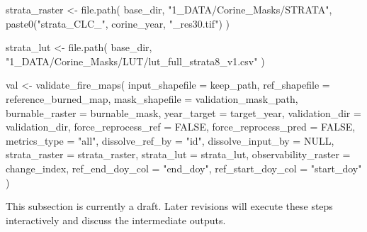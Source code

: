 \documentclass[
  british,
  a4paper,
]{scrbook}
\newenvironment{Shaded}{\begin{snugshade}}{\end{snugshade}}
\newcommand{\AttributeTok}[1]{\textcolor[rgb]{0.40,0.45,0.13}{#1}}
\newcommand{\ConstantTok}[1]{\textcolor[rgb]{0.56,0.35,0.01}{#1}}
\newcommand{\FunctionTok}[1]{\textcolor[rgb]{0.28,0.35,0.67}{#1}}
\newcommand{\NormalTok}[1]{\textcolor[rgb]{0.00,0.23,0.31}{#1}}
\newcommand{\OtherTok}[1]{\textcolor[rgb]{0.00,0.23,0.31}{#1}}
\newcommand{\StringTok}[1]{\textcolor[rgb]{0.13,0.47,0.30}{#1}}
\begin{document}
\begin{Shaded}
\begin{Highlighting}[]
\NormalTok{strata\_raster }\OtherTok{\textless{}{-}} \FunctionTok{file.path}\NormalTok{(}
\NormalTok{  base\_dir,}
  \StringTok{"1\_DATA/Corine\_Masks/STRATA"}\NormalTok{,}
  \FunctionTok{paste0}\NormalTok{(}\StringTok{"strata\_CLC\_"}\NormalTok{, corine\_year, }\StringTok{"\_res30.tif"}\NormalTok{)}
\NormalTok{)}

\NormalTok{strata\_lut }\OtherTok{\textless{}{-}} \FunctionTok{file.path}\NormalTok{(}
\NormalTok{  base\_dir,}
  \StringTok{"1\_DATA/Corine\_Masks/LUT/lut\_full\_strata8\_v1.csv"}
\NormalTok{)}
\end{Highlighting}
\end{Shaded}

\begin{Shaded}
\begin{Highlighting}[]
\NormalTok{val }\OtherTok{\textless{}{-}} \FunctionTok{validate\_fire\_maps}\NormalTok{(}
  \AttributeTok{input\_shapefile =}\NormalTok{ keep\_path,}
  \AttributeTok{ref\_shapefile =}\NormalTok{ reference\_burned\_map,}
  \AttributeTok{mask\_shapefile =}\NormalTok{ validation\_mask\_path,}
  \AttributeTok{burnable\_raster =}\NormalTok{ burnable\_mask,}
  \AttributeTok{year\_target =}\NormalTok{ target\_year,}
  \AttributeTok{validation\_dir =}\NormalTok{ validation\_dir,}
  \AttributeTok{force\_reprocess\_ref =} \ConstantTok{FALSE}\NormalTok{,}
  \AttributeTok{force\_reprocess\_pred =} \ConstantTok{FALSE}\NormalTok{,}
  \AttributeTok{metrics\_type =} \StringTok{"all"}\NormalTok{,}
  \AttributeTok{dissolve\_ref\_by =} \StringTok{"id"}\NormalTok{,}
  \AttributeTok{dissolve\_input\_by =} \ConstantTok{NULL}\NormalTok{,}
  \AttributeTok{strata\_raster =}\NormalTok{ strata\_raster,}
  \AttributeTok{strata\_lut =}\NormalTok{ strata\_lut,}
  \AttributeTok{observability\_raster =}\NormalTok{ change\_index,}
  \AttributeTok{ref\_end\_doy\_col =} \StringTok{"end\_doy"}\NormalTok{,}
  \AttributeTok{ref\_start\_doy\_col =} \StringTok{"start\_doy"}
\NormalTok{)}
\end{Highlighting}
\end{Shaded}

\begin{tcolorbox}[enhanced jigsaw, arc=.35mm, bottomrule=.15mm, bottomtitle=1mm, breakable, colback=white, colbacktitle=quarto-callout-note-color!10!white, colframe=quarto-callout-note-color-frame, coltitle=black, left=2mm, leftrule=.75mm, opacityback=0, opacitybacktitle=0.6, rightrule=.15mm, title=\textcolor{quarto-callout-note-color}{\faInfo}\hspace{0.5em}{Note}, titlerule=0mm, toprule=.15mm, toptitle=1mm]

This subsection is currently a draft. Later revisions will execute these
steps interactively and discuss the intermediate outputs.

\end{tcolorbox}


\backmatter
\end{document}
